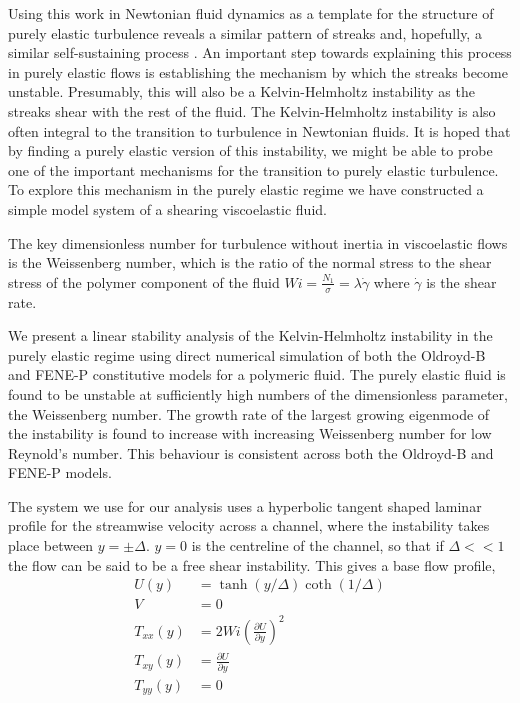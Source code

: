 \documentclass{jfm}
\newcommand{\dy}[1]{\frac{\partial #1}{\partial y}}
\begin{document}
Using this work in Newtonian fluid dynamics as a template for the structure of
purely elastic turbulence reveals a similar pattern of streaks and, hopefully,
a similar self-sustaining process \cite{US!}. An important step towards
explaining this process in purely elastic flows is establishing the mechanism
by which the streaks become unstable. Presumably, this will also be a
Kelvin-Helmholtz instability as the streaks shear with the rest of the fluid.
The Kelvin-Helmholtz instability is also often integral to the transition to
turbulence in Newtonian fluids. It is hoped that by finding a purely elastic
version of this instability, we might be able to probe one of the important
mechanisms for the transition to purely elastic turbulence. To explore this
mechanism in the purely elastic regime we have constructed a simple model
system of a shearing viscoelastic fluid.

The key dimensionless number for turbulence without inertia in viscoelastic
flows is the Weissenberg number, which is the ratio of the normal stress to the
shear stress of the polymer component of the fluid $Wi = \frac{N_{1}}{\sigma} =
\lambda \dot{\gamma}$ where $\dot{\gamma}$ is the shear rate.

We present a linear stability analysis of the Kelvin-Helmholtz instability in
the purely elastic regime using direct numerical simulation of both the
Oldroyd-B and FENE-P constitutive models for a polymeric fluid. The purely
elastic fluid is found to be unstable at sufficiently high numbers of the
dimensionless parameter, the Weissenberg number. The growth rate of the largest
growing eigenmode of the instability is found to increase with increasing
Weissenberg number for low Reynold's number. This behaviour is consistent
across both the Oldroyd-B and FENE-P models.

The system we use for our analysis uses a hyperbolic tangent shaped laminar
profile for the streamwise velocity across a channel, where the instability
takes place between $y = \pm \Delta$. $y=0$ is the centreline of the channel,
so that if $\Delta << 1$ the flow can be said to be a free shear instability.
This gives a base flow profile, 
\begin{align}
    U(y) &= \tanh \left( y/\Delta \right) \coth \left( 1/\Delta \right) \nonumber\\
    V &= 0 \nonumber \\
    T_{xx}(y) &= 2 Wi \left( \dy{U} \right)^{2} \nonumber \\
    T_{xy}(y) &= \dy{U} \nonumber \\
    T_{yy}(y) &= 0 \nonumber 
    \label{eq:KH_laminar_profile}
\end{align}
\end{document}
